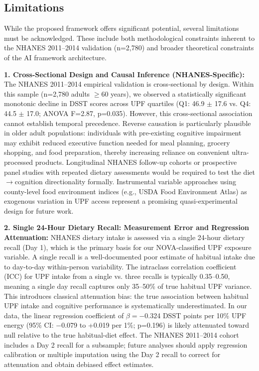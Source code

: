 \documentclass[journal,twoside,10pt]{IEEEtran}
\begin{document}
\subsection{Limitations}

While the proposed framework offers significant potential, several limitations must be acknowledged. These include both methodological constraints inherent to the NHANES 2011--2014 validation (n=2,780) and broader theoretical constraints of the AI framework architecture.

\textbf{1. Cross-Sectional Design and Causal Inference (NHANES-Specific):}
The NHANES 2011--2014 empirical validation is cross-sectional by design. Within this sample (n=2,780 adults $\geq$60 years), we observed a statistically significant monotonic decline in DSST scores across UPF quartiles (Q1: 46.9 $\pm$ 17.6 vs. Q4: 44.5 $\pm$ 17.0; ANOVA F=2.87, p=0.035). However, this cross-sectional association cannot establish temporal precedence. Reverse causation is particularly plausible in older adult populations: individuals with pre-existing cognitive impairment may exhibit reduced executive function needed for meal planning, grocery shopping, and food preparation, thereby increasing reliance on convenient ultra-processed products. Longitudinal NHANES follow-up cohorts or prospective panel studies with repeated dietary assessments would be required to test the diet$\rightarrow$cognition directionality formally. Instrumental variable approaches using county-level food environment indices (e.g., USDA Food Environment Atlas) as exogenous variation in UPF access represent a promising quasi-experimental design for future work.

\textbf{2. Single 24-Hour Dietary Recall: Measurement Error and Regression Attenuation:}
NHANES dietary intake is assessed via a single 24-hour dietary recall (Day 1), which is the primary basis for our NOVA-classified UPF exposure variable. A single recall is a well-documented poor estimate of habitual intake due to day-to-day within-person variability. The intraclass correlation coefficient (ICC) for UPF intake from a single vs. three recalls is typically 0.35--0.50, meaning a single day recall captures only 35--50\% of true habitual UPF variance. This introduces classical attenuation bias: the true association between habitual UPF intake and cognitive performance is systematically underestimated. In our data, the linear regression coefficient of $\beta=$$-$0.324 DSST points per 10\% UPF energy (95\% CI: $-$0.079 to +0.019 per 1\%; p=0.196) is likely attenuated toward null relative to the true habitual-diet effect. The NHANES 2011--2014 cohort includes a Day 2 recall for a subsample; future analyses should apply regression calibration or multiple imputation using the Day 2 recall to correct for attenuation and obtain debiased effect estimates.
\end{document}
